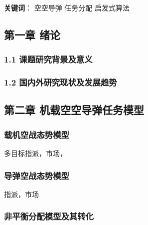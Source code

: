 \textbf{关键词}： 空空导弹 任务分配 启发式算法

\hypertarget{ux7b2cux4e00ux7ae0-ux7eeaux8bba}{%
\subsection{第一章 绪论}\label{ux7b2cux4e00ux7ae0-ux7eeaux8bba}}

\hypertarget{ux8bfeux9898ux7814ux7a76ux80ccux666fux53caux610fux4e49}{%
\subsubsection{1.1
课题研究背景及意义}\label{ux8bfeux9898ux7814ux7a76ux80ccux666fux53caux610fux4e49}}

\hypertarget{ux56fdux5185ux5916ux7814ux7a76ux73b0ux72b6ux53caux53d1ux5c55ux8d8bux52bf}{%
\subsubsection{1.2
国内外研究现状及发展趋势}\label{ux56fdux5185ux5916ux7814ux7a76ux73b0ux72b6ux53caux53d1ux5c55ux8d8bux52bf}}

\hypertarget{ux7b2cux4e8cux7ae0-ux673aux8f7dux7a7aux7a7aux5bfcux5f39ux4efbux52a1ux6a21ux578b}{%
\subsection{第二章
机载空空导弹任务模型}\label{ux7b2cux4e8cux7ae0-ux673aux8f7dux7a7aux7a7aux5bfcux5f39ux4efbux52a1ux6a21ux578b}}

\hypertarget{ux8f7dux673aux7a7aux6218ux6001ux52bfux6a21ux578b}{%
\subsubsection{载机空战态势模型}\label{ux8f7dux673aux7a7aux6218ux6001ux52bfux6a21ux578b}}

多目标指派，市场，

\hypertarget{ux5bfcux5f39ux7a7aux6218ux6001ux52bfux6a21ux578b}{%
\subsubsection{导弹空战态势模型}\label{ux5bfcux5f39ux7a7aux6218ux6001ux52bfux6a21ux578b}}

指派，市场

\hypertarget{ux975eux5e73ux8861ux5206ux914dux6a21ux578bux53caux5176ux8f6cux5316}{%
\subsubsection{非平衡分配模型及其转化}\label{ux975eux5e73ux8861ux5206ux914dux6a21ux578bux53caux5176ux8f6cux5316}}

